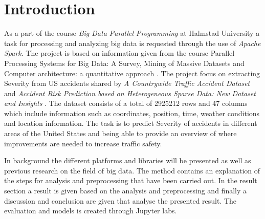 \documentclass[../main.tex]{subfiles}
\begin{document}
\section{Introduction}
As a part of the course \textit{Big Data Parallel Programming} at Halmstad University a task for processing and analyzing big data is requested through the use of \textit{Apache Spark}. The project is based on information given from the course Parallel Processing Systems for Big Data: A Survey\cite{zhang2016parallel}, Mining of Massive Datasets \cite{leskovec2020mining} and Computer  architecture: a quantitative  approach \cite{hennessy2011computer}. The project focus on extracting Severity from US accidents shared by \textit{A Countrywide Traffic Accident Dataset} \cite{moosavi2019countrywide} and \textit{Accident Risk Prediction based on Heterogeneous Sparse Data: New Dataset and Insights} \cite{moosavi2019accident}. The dataset consists of a total of 2925212 rows and 47 columns which include information such as coordinates, position, time, weather conditions and location information. The task is to predict Severity of accidents in different areas of the United States and being able to provide an overview of where improvements are needed to increase traffic safety.

In background the different platforms and libraries will be presented as well as previous research on the field of big data. The method contains an explanation of the steps for analysis and preprocessing that have been carried out. In the result section a result is given based on the analysis and preprocessing and finally a discussion and conclusion are given that analyse the presented result. The evaluation and models is created through Jupyter labs.
\end{document}
